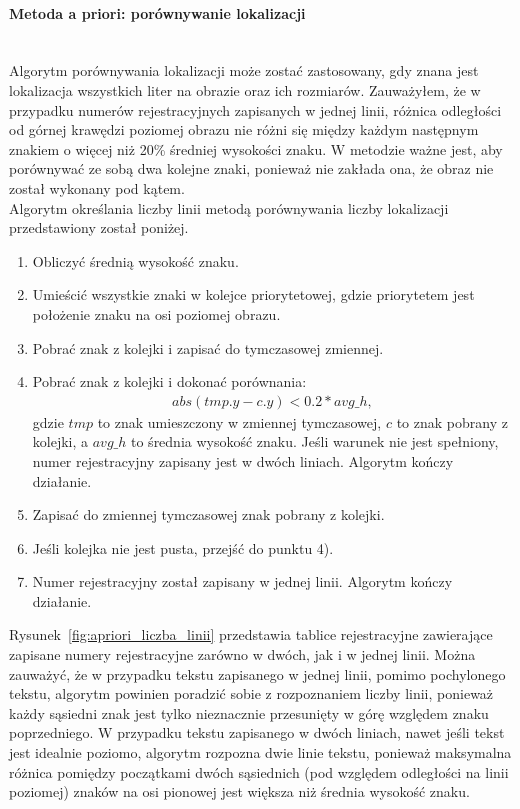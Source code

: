 \paragraph{Metoda a priori: porównywanie lokalizacji}\mbox{}\\
Algorytm porównywania lokalizacji może zostać zastosowany, gdy znana jest lokalizacja wszystkich liter na obrazie oraz ich rozmiarów. Zauważyłem, że w przypadku numerów rejestracyjnych zapisanych w jednej linii, różnica odległości od górnej krawędzi poziomej obrazu nie różni się między każdym następnym znakiem o więcej niż 20\% średniej wysokości znaku. W metodzie ważne jest, aby porównywać ze sobą dwa kolejne znaki, ponieważ nie zakłada ona, że obraz nie został wykonany pod kątem.\\
Algorytm określania liczby linii metodą porównywania liczby lokalizacji przedstawiony został poniżej.
\begin{enumerate}
  \item Obliczyć średnią wysokość znaku.
  \item Umieścić wszystkie znaki w kolejce priorytetowej, gdzie priorytetem jest położenie znaku na osi poziomej obrazu.
  \item Pobrać znak z kolejki i zapisać do tymczasowej zmiennej.
  \item Pobrać znak z kolejki i dokonać porównania:
    \begin{gather*}
      abs(tmp.y - c.y) < 0.2*avg\_h,
    \end{gather*}
    gdzie $tmp$ to znak umieszczony w zmiennej tymczasowej, $c$ to znak pobrany z kolejki, a $avg\_h$ to średnia wysokość znaku. Jeśli warunek nie jest spełniony, numer rejestracyjny zapisany jest w dwóch liniach. Algorytm kończy działanie.
  \item Zapisać do zmiennej tymczasowej znak pobrany z kolejki.
  \item Jeśli kolejka nie jest pusta, przejść do punktu 4).
  \item Numer rejestracyjny został zapisany w jednej linii. Algorytm kończy działanie.
\end{enumerate}
Rysunek~\ref{fig:apriori_liczba_linii} przedstawia tablice rejestracyjne zawierające zapisane numery rejestracyjne zarówno w dwóch, jak i w jednej linii. Można zauważyć, że w przypadku tekstu zapisanego w jednej linii, pomimo pochylonego tekstu, algorytm powinien poradzić sobie z rozpoznaniem liczby linii, ponieważ każdy sąsiedni znak jest tylko nieznacznie przesunięty w górę względem znaku poprzedniego. W przypadku tekstu zapisanego w dwóch liniach, nawet jeśli tekst jest idealnie poziomo, algorytm rozpozna dwie linie tekstu, ponieważ maksymalna różnica pomiędzy początkami dwóch sąsiednich (pod względem odległości na linii poziomej) znaków na osi pionowej jest większa niż średnia wysokość znaku.

